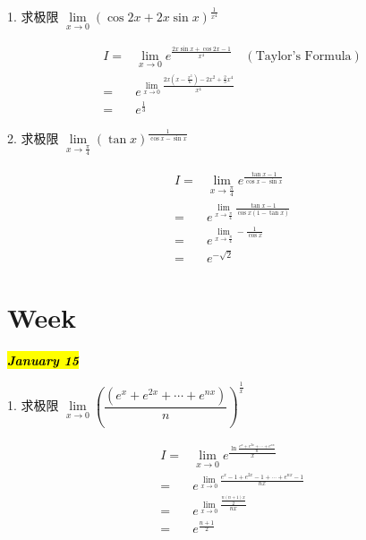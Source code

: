 1. 求极限 $\lim\limits_{x\to 0}(\cos 2x+2x\sin x)^{\frac{1}{x^{4}}}$
\begin{solution}

	\begin{align*}
		I = & \lim\limits_{x\to 0}e^{\frac{2x\sin x+\cos 2x-1}{x^{4}}}\quad (\text{Taylor's Formula})\\
		  = & e^{\lim\limits_{x\to 0}\frac{2x(x-\frac{x^{3}}{6})-2x^{2}+\frac{2}{3}x^{4}}{x^{4}}}\\
		  = & e^{\frac{1}{3}}
	\end{align*}
\end{solution}

2. 求极限 $\lim\limits_{x\to \frac{\pi}{4}}\left( \tan x\right) ^{\frac{1}{\cos x-\sin x}}$
\begin{solution}

	\begin{align*}
		I = & \lim\limits_{x\to \frac{\pi}{4}}e^{\frac{\tan x-1}{\cos x-\sin x}}\\
		  = & e^{\lim\limits_{x\to \frac{\pi}{4}}\frac{\tan x-1}{\cos x(1-\tan x)}}\\
		  = & e^{\lim\limits_{x\to \frac{\pi}{4}}-\frac{1}{\cos x}}\\
		  = & e^{-\sqrt{2}}
	\end{align*}
\end{solution}
\section{Week }
\hl{\textbf{\textit{January 15}}}

1. 求极限 $\lim\limits_{x\to 0}\left(\dfrac{(e^{x}+e^{2x}+\cdots +e^{nx})}{n} \right)^{\frac{1}{x}} $
\begin{solution}

	\begin{align*}
		I = & \lim\limits_{x\to 0}e^{\frac{\ln \frac{e^{x}+e^{2x}+\cdots +e^{nx}}{n}}{x}}\\
		  = & e^{\lim\limits_{x\to 0}\frac{e^{x}-1+e^{2x}-1+\cdots +e^{nx}-1}{nx}}\\
		  = & e^{\lim\limits_{x\to 0}\frac{\frac{n(n+1)x}{2}}{nx}}\\
		  = & e^{\frac{n+1}{2}}
	\end{align*}
\end{solution}

